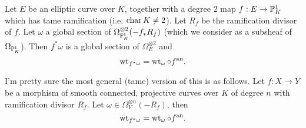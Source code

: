 \begin{proposition}
Let $E$ be an elliptic curve  over $K$, together with a degree $2$ map $f: E \to \mathbb{P}^{1}_K$ which has tame ramification (i.e. $\operatorname{char} K \ne 2$). 
Let $R_f$ be the ramification divisor of $f$. 
	Let $\omega $ a global section of $\Omega_{\mathbb{P}^{1}_K}^{\otimes 2}(-f_* R_f)$ (which we consider as a subsheaf of $\Omega_{\mathbb{P}^{1}_K}$). 
	Then $f^* \omega$ is a global section of $\Omega_{E}^{\otimes 2}$ and \[
	\operatorname{wt}_{f^*\omega} = \operatorname{wt}_{\omega} \circ f{}^{\text{an}}
	.\] 
\end{proposition}
\begin{remark}
	I'm pretty sure the most general (tame) version of this is as follows. 
	Let $f: X \to Y $ be a morphism of smooth connected, projective curves over $K$ of degree $n$ with ramification divisor $R_f$. 
	Let $\omega \in \Omega_Y^{\otimes n}(-R_f)$, then \[
	\operatorname{wt}_{f^* \omega} = \operatorname{wt}_{\omega} \circ f{}^{\text{an}}
	.\] 
\end{remark}
